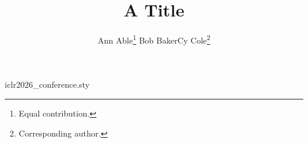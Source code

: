 \begin{filecontents*}[overwrite]{iclr2026_conference.sty}
\def\maketitle{\par
\begingroup
   \def\thefootnote{\fnsymbol{footnote}}
   \def\@makefnmark{\hbox to 0pt{$^{\@thefnmark}$\hss}}
   \@maketitle \@thanks
\endgroup
\setcounter{footnote}{0}
\let\maketitle\relax \let\@maketitle\relax
\gdef\@thanks{}\gdef\@author{}\gdef\@title{}\let\thanks\relax}
\def\@maketitle{\vbox{\hsize\textwidth
{\LARGE\sc \@title\par}
  \def\And{\end{tabular}\hfil\linebreak[0]\hfil\begin{tabular}[t]{l}\bf\rule{\z@}{24pt}\ignorespaces}%
  \begin{tabular}[t]{l}\bf\rule{\z@}{24pt}\@author\end{tabular}}}
\end{filecontents*}
\documentclass{article}
\usepackage{iclr2026_conference}
\title{A Title}
\author{Ann Able\thanks{Equal contribution.} \And Bob Baker\footnotemark[1] \And Cy Cole\thanks{Corresponding author.}}

\maketitle
Body.


